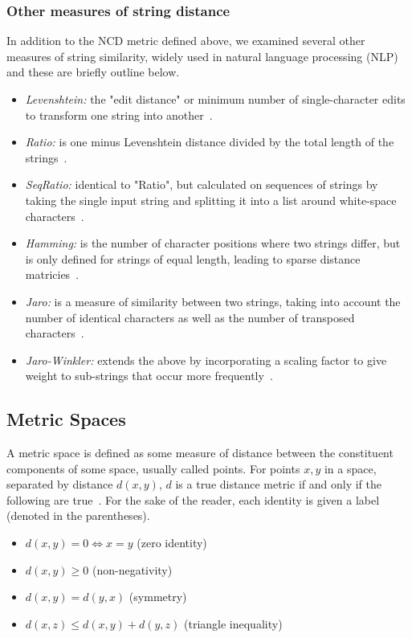 \documentclass{article}
\begin{document}
\subsubsection{Other measures of string distance}
\label{string_metrics}
In addition to the NCD metric defined above, we examined several other measures of string similarity, widely used in natural language processing (NLP) and these are briefly outline below.
\begin{itemize}
    \item \textit{Levenshtein:} the "edit distance" or minimum number of single-character edits to transform one string into another~\cite{navarro2001guided}.
    \item \textit{Ratio:} is one minus Levenshtein distance divided by the total length of the strings~\cite{levenshtein}.
    \item \textit{SeqRatio:} identical to "Ratio", but calculated on sequences of strings by taking the single input string and splitting it into a list around white-space characters~\cite{levenshtein}.
    \item \textit{Hamming:} is the number of character positions where two strings differ, but is only defined for strings of equal length, leading to sparse distance matricies~\cite{hamming_distance}.
    \item \textit{Jaro:} is a measure of similarity between two strings, taking into account the number of identical characters as well as the number of transposed characters~\cite{jaro}.
    \item \textit{Jaro-Winkler:} extends the above by incorporating a scaling factor to give weight to sub-strings that occur more frequently~\cite{jaro}. 
\end{itemize}



\subsection{Metric Spaces}

A metric space is defined as some measure of distance between the constituent components of some space, usually called points.  For points $x,y$ in a space, separated by distance $d(x,y)$, $d$ is a true distance metric if and only if the following are true~\cite{metrics}. For the sake of the reader, each identity is given a label (denoted in the parentheses). 

\label{metric_spaces}
\begin{itemize}
    \item $d(x, y) = 0 \iff x = y$ (zero identity)
    \item $d(x, y) \geq 0$ (non-negativity)
    \item $d(x, y) = d(y, x)$ (symmetry)
    \item $d(x, z) \leq d(x, y) + d(y, z)$ (triangle inequality)
\end{itemize}
\end{document}
